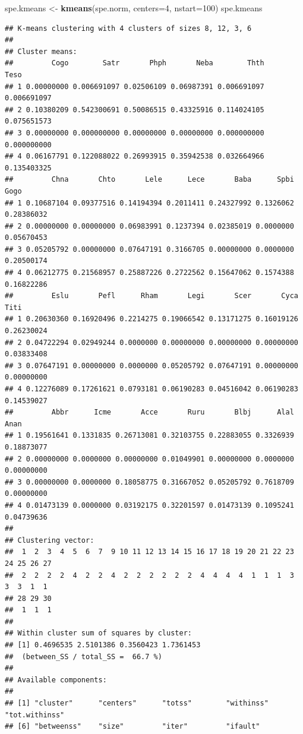 \documentclass[
]{book}
\newenvironment{Shaded}{\begin{snugshade}}{\end{snugshade}}
\newcommand{\DataTypeTok}[1]{\textcolor[rgb]{0.13,0.29,0.53}{#1}}
\newcommand{\DecValTok}[1]{\textcolor[rgb]{0.00,0.00,0.81}{#1}}
\newcommand{\KeywordTok}[1]{\textcolor[rgb]{0.13,0.29,0.53}{\textbf{#1}}}
\newcommand{\NormalTok}[1]{#1}
\newcommand{\StringTok}[1]{\textcolor[rgb]{0.31,0.60,0.02}{#1}}
\begin{document}
\begin{Shaded}
\begin{Highlighting}[]
\NormalTok{spe.kmeans <-}\StringTok{ }\KeywordTok{kmeans}\NormalTok{(spe.norm, }\DataTypeTok{centers=}\DecValTok{4}\NormalTok{, }\DataTypeTok{nstart=}\DecValTok{100}\NormalTok{)}
\NormalTok{spe.kmeans}
\end{Highlighting}
\end{Shaded}

\begin{verbatim}
## K-means clustering with 4 clusters of sizes 8, 12, 3, 6
## 
## Cluster means:
##         Cogo        Satr       Phph       Neba        Thth        Teso
## 1 0.00000000 0.006691097 0.02506109 0.06987391 0.006691097 0.006691097
## 2 0.10380209 0.542300691 0.50086515 0.43325916 0.114024105 0.075651573
## 3 0.00000000 0.000000000 0.00000000 0.00000000 0.000000000 0.000000000
## 4 0.06167791 0.122088022 0.26993915 0.35942538 0.032664966 0.135403325
##         Chna       Chto       Lele      Lece       Baba      Spbi       Gogo
## 1 0.10687104 0.09377516 0.14194394 0.2011411 0.24327992 0.1326062 0.28386032
## 2 0.00000000 0.00000000 0.06983991 0.1237394 0.02385019 0.0000000 0.05670453
## 3 0.05205792 0.00000000 0.07647191 0.3166705 0.00000000 0.0000000 0.20500174
## 4 0.06212775 0.21568957 0.25887226 0.2722562 0.15647062 0.1574388 0.16822286
##         Eslu       Pefl      Rham       Legi       Scer       Cyca       Titi
## 1 0.20630360 0.16920496 0.2214275 0.19066542 0.13171275 0.16019126 0.26230024
## 2 0.04722294 0.02949244 0.0000000 0.00000000 0.00000000 0.00000000 0.03833408
## 3 0.07647191 0.00000000 0.0000000 0.05205792 0.07647191 0.00000000 0.00000000
## 4 0.12276089 0.17261621 0.0793181 0.06190283 0.04516042 0.06190283 0.14539027
##         Abbr      Icme       Acce       Ruru       Blbj      Alal       Anan
## 1 0.19561641 0.1331835 0.26713081 0.32103755 0.22883055 0.3326939 0.18873077
## 2 0.00000000 0.0000000 0.00000000 0.01049901 0.00000000 0.0000000 0.00000000
## 3 0.00000000 0.0000000 0.18058775 0.31667052 0.05205792 0.7618709 0.00000000
## 4 0.01473139 0.0000000 0.03192175 0.32201597 0.01473139 0.1095241 0.04739636
## 
## Clustering vector:
##  1  2  3  4  5  6  7  9 10 11 12 13 14 15 16 17 18 19 20 21 22 23 24 25 26 27 
##  2  2  2  2  4  2  2  4  2  2  2  2  2  2  4  4  4  4  1  1  1  3  3  3  1  1 
## 28 29 30 
##  1  1  1 
## 
## Within cluster sum of squares by cluster:
## [1] 0.4696535 2.5101386 0.3560423 1.7361453
##  (between_SS / total_SS =  66.7 %)
## 
## Available components:
## 
## [1] "cluster"      "centers"      "totss"        "withinss"     "tot.withinss"
## [6] "betweenss"    "size"         "iter"         "ifault"
\end{verbatim}
\end{document}
